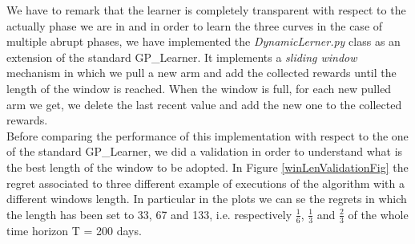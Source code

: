We have to remark that the learner is completely transparent with respect to the actually phase we are in and in order to learn the three curves in the case of multiple abrupt phases, we have implemented the \textit{DynamicLerner.py} class as an extension of the standard GP\_Learner.
It implements a \textit{sliding window} mechanism in which we pull a new arm and add the collected rewards until the length of the window is reached. When the window is full, for each new pulled arm we get, we delete the last recent value and add the new one to the collected rewards.\\ Before comparing the performance of this implementation with respect to the one of the standard GP\_Learner, we did a validation in order to understand what is the best length of the window to be adopted. In Figure \ref{winLenValidationFig} the regret associated to three different example of executions of the algorithm with a different windows length. In particular in the plots we can se the regrets in which the length has been set to 33, 67 and 133, i.e. respectively $\frac{1}{6}$, $\frac{1}{3}$ and $\frac{2}{3}$ of the whole time horizon T = 200 days.
